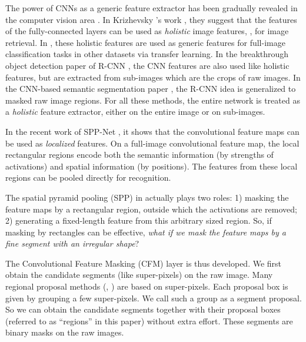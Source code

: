 \documentclass[10pt,twocolumn,letterpaper]{article}
\begin{document}
The power of CNNs as a generic feature extractor has been gradually revealed in the computer vision area \cite{krizhevsky2012imagenet,Donahue2013,zeiler2013visualizing,girshick2013rich,he2014spatial}. In Krizhevsky \etal's work \cite{krizhevsky2012imagenet}, they suggest that the features of the fully-connected layers can be used as \emph{holistic} image features, \eg, for image retrieval. In \cite{Donahue2013,zeiler2013visualizing}, these holistic features are used as generic features for full-image classification tasks in other datasets via transfer learning. In the breakthrough object detection paper of R-CNN \cite{girshick2013rich}, the CNN features are also used like holistic features, but are extracted from sub-images which are the crops of raw images. In the CNN-based semantic segmentation paper \cite{hariharan2014simultaneous}, the R-CNN idea is generalized to masked raw image regions. For all these methods, the entire network is treated as a \emph{holistic} feature extractor, either on the entire image or on sub-images.

In the recent work of SPP-Net \cite{he2014spatial}, it shows that the convolutional feature maps can be used as \emph{localized} features. On a full-image convolutional feature map, the local rectangular regions encode both the semantic information (by strengths of activations) and spatial information (by positions). The features from these local regions can be pooled \cite{he2014spatial} directly for recognition.

The spatial pyramid pooling (SPP) in \cite{he2014spatial} actually plays two roles: 1) masking the feature maps by a rectangular region, outside which the activations are removed; 2) generating a fixed-length feature from this arbitrary sized region. So, if masking by rectangles can be effective, \emph{what if we mask the feature maps by a fine segment with an irregular shape}?

The Convolutional Feature Masking (CFM) layer is thus developed. We first obtain the candidate segments (like super-pixels) on the raw image. Many regional proposal methods (\eg, \cite{uijlings2013selective,arbelaez2014multiscale}) are based on super-pixels. Each proposal box is given by grouping a few super-pixels. We call such a group as a segment proposal. So we can obtain the candidate segments together with their proposal boxes (referred to as ``regions'' in this paper) without extra effort. These segments are binary masks on the raw images.
\end{document}
